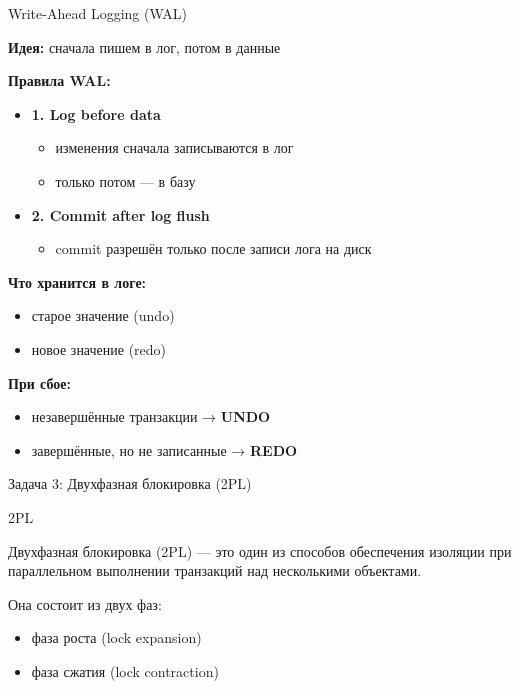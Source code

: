 \documentclass{beamer}
\newenvironment{definitionbox}[1][Определение]{%
  \begin{exampleblock}{#1}
}{%
  \end{exampleblock}
}
\begin{document}
\begin{frame}{Write-Ahead Logging (WAL)}

\textbf{Идея:} сначала пишем в лог, потом в данные

\vspace{0.7em}

\textbf{Правила WAL:}
\begin{itemize}
    \item \textbf{1. Log before data}
    \begin{itemize}
        \item изменения сначала записываются в лог
        \item только потом — в базу
    \end{itemize}

    \item \textbf{2. Commit after log flush}
    \begin{itemize}
        \item commit разрешён только после записи лога на диск
    \end{itemize}
\end{itemize}

\vspace{0.7em}

\textbf{Что хранится в логе:}
\begin{itemize}
    \item старое значение (undo)
    \item новое значение (redo)
\end{itemize}

\vspace{0.7em}

\textbf{При сбое:}
\begin{itemize}
    \item незавершённые транзакции → \textbf{UNDO}
    \item завершённые, но не записанные → \textbf{REDO}
\end{itemize}


\end{frame}


\begin{frame}{Задача 3: Двухфазная блокировка (2PL)}

\begin{definitionbox}[2PL]
Двухфазная блокировка (2PL) — это один из способов обеспечения изоляции
при параллельном выполнении транзакций над несколькими объектами.

\vspace{0.5em}

Она состоит из двух фаз:
\begin{itemize}
    \item фаза роста (lock expansion)
    \item фаза сжатия (lock contraction)
\end{itemize}
\end{definitionbox}

\vspace{0.7em}

\end{frame}
\end{document}
